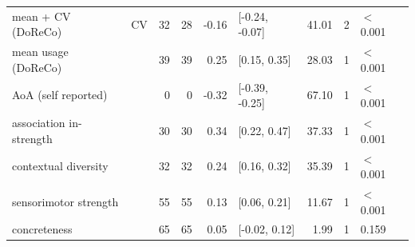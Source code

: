 \begin{table}[ht]
\begin{tabular}{llrrrlrrl}
  mean + CV (DoReCo) & CV & 32 & 28 & -0.16 & [-0.24, -0.07] & 41.01 & 2 & $<$ 0.001 \\ 
  mean usage (DoReCo) &  & 39 & 39 & 0.25 & [0.15, 0.35] & 28.03 & 1 & $<$ 0.001 \\ 
  AoA (self reported) &  & 0 & 0 & -0.32 & [-0.39, -0.25] & 67.10 & 1 & $<$ 0.001 \\ 
  association in-strength &  & 30 & 30 & 0.34 & [0.22, 0.47] & 37.33 & 1 & $<$ 0.001 \\ 
  contextual diversity &  & 32 & 32 & 0.24 & [0.16, 0.32] & 35.39 & 1 & $<$ 0.001 \\ 
  sensorimotor strength &  & 55 & 55 & 0.13 & [0.06, 0.21] & 11.67 & 1 & $<$ 0.001 \\ 
  concreteness &  & 65 & 65 & 0.05 & [-0.02, 0.12] & 1.99 & 1 & 0.159 \\ 
   \hline
\end{tabular}
\end{table}
